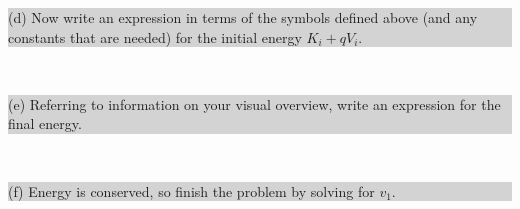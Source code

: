 \documentclass[]{article}
\newcommand{\excerpt}[1]{\colorbox{lightgray}{\parbox{14.8cm}{#1}} \\}
\begin{document}
\excerpt{
(d) Now write an expression in terms of the symbols defined above (and any constants that are needed) for the initial energy $ K_{i} + qV_{i} $.
}
\phantom{\parbox{\textwidth}{
\[
K_{i} + qV_{i} = \frac{1}{2}m_{1}v_{1}^{2} + 0
\]
}}
\excerpt{
(e) Referring to information on your visual overview, write an expression for the final energy.
}
\phantom{\parbox{\textwidth}{
\[
K_{f} + qV_{f} = 0 + \frac{1}{4\pi\epsilon_{0}}\frac{q_{1}q_{2}}{R_{1}+R_{2}}
\]
}}
\excerpt{
(f) Energy is conserved, so finish the problem by solving for $ v_{1} $.
}
\end{document}
